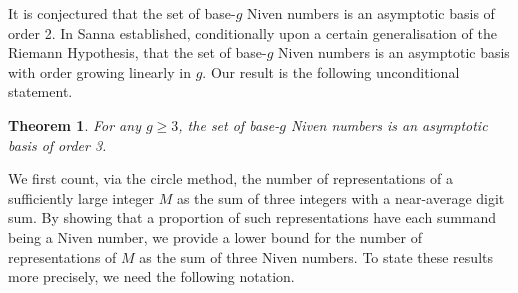 \documentclass[hidelinks,11pt,reqno]{amsart}
\renewcommand{\geq}{\geqslant}
\newtheorem{theorem}[prop]{Theorem}
\theoremstyle{remark}
\begin{document}
It is conjectured that the set of base-$g$ Niven numbers is an asymptotic basis of order 2. In \cite{sanna2021additive} Sanna established, conditionally upon a certain generalisation of the Riemann Hypothesis, that the set of base-$g$ Niven numbers is an asymptotic basis with order growing linearly in $g$. Our result is the following unconditional statement.
\begin{theorem}\label{Main theorem 1}
   For any $g\geq 3$, the set of base-$g$ Niven numbers is an asymptotic basis of order 3.
\end{theorem}
We first count, via the circle method, the number of representations of a sufficiently large integer $M$ as the sum of three integers with a near-average digit sum. By showing that a proportion of such representations have each summand being a Niven number, we provide a lower bound for the number of representations of $M$ as the sum of three Niven numbers. To state these results more precisely, we need the following notation.
\end{document}
